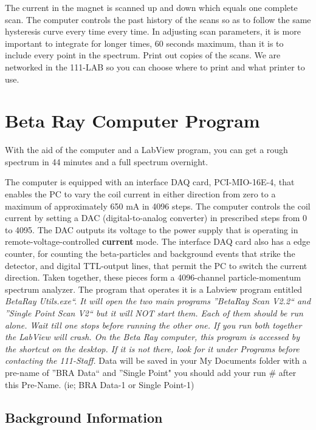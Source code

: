 \documentclass{../lab}
\begin{document}
The current in the magnet is scanned up and down which equals one complete scan. The computer controls the past history of the scans so as to follow the same hysteresis curve every time every time. In adjusting scan parameters, it is more important to integrate for longer times, 60 seconds maximum, than it is to include every point in the spectrum. Print out copies of the scans. We are networked in the 111-LAB so you can choose where to print and what printer to use.

\section{Beta Ray Computer Program}

With the aid of the computer and a LabView program, you can get a rough spectrum in 44 minutes and a full spectrum overnight.

The computer is equipped with an interface DAQ card, PCI-MIO-16E-4, that enables the PC to vary the coil current in either direction from zero to a maximum of approximately 650 mA in 4096 steps. The computer controls the coil current by setting a DAC (digital-to-analog converter) in prescribed steps from 0 to 4095. The DAC outputs its voltage to the power supply that is operating in remote-voltage-controlled \textbf{current} mode. The interface DAQ card also has a edge counter, for counting the beta-particles and background events that strike the detector, and digital TTL-output lines, that permit the PC to switch the current direction. Taken together, these pieces form a 4096-channel particle-momentum spectrum analyzer. The program that operates it is a Labview program entitled \emph{BetaRay Utils.exe``. It will open the two main programs ''BetaRay Scan V2.2`` and ''Single Point Scan V2`` but it will NOT start them. Each of them should be run alone. Wait till one stops before running the other one. If you run both together the LabView will crash. On the Beta Ray computer, this program is accessed by the shortcut on the desktop. If it is not there, look for it under Programs before contacting the 111-Staff.} Data will be saved in your My Documents folder with a pre-name of ''BRA Data`` and ''Single Point" you should add your run \# after this Pre-Name. (ie; BRA Data-1 or Single Point-1)

\subsection{Background Information}
\end{document}
